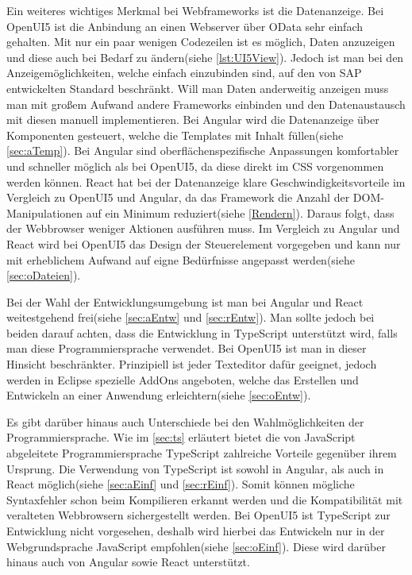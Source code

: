 Ein weiteres wichtiges Merkmal bei Webframeworks ist die Datenanzeige. Bei OpenUI5 ist die Anbindung an einen Webserver über OData sehr einfach gehalten. Mit nur ein paar wenigen Codezeilen ist es möglich, Daten anzuzeigen und diese auch bei Bedarf zu ändern(siehe \autoref{lst:UI5View}). Jedoch ist man bei den Anzeigemöglichkeiten, welche einfach einzubinden sind, auf den von SAP entwickelten Standard beschränkt. Will man Daten anderweitig anzeigen muss man mit großem Aufwand andere Frameworks einbinden und den Datenaustausch mit diesen manuell implementieren. Bei Angular wird die Datenanzeige über Komponenten gesteuert, welche die Templates mit Inhalt füllen(siehe \autoref{sec:aTemp}). Bei Angular sind oberflächenspezifische Anpassungen komfortabler und schneller möglich als bei OpenUI5, da diese direkt im CSS vorgenommen werden können. React hat bei der Datenanzeige klare Geschwindigkeitsvorteile im Vergleich zu OpenUI5 und Angular, da das Framework die Anzahl der DOM-Manipulationen auf ein Minimum reduziert(siehe \autoref{Rendern}). Daraus folgt, dass der Webbrowser weniger Aktionen ausführen muss. Im Vergleich zu Angular und React wird bei OpenUI5 das Design der Steuerelement vorgegeben und kann nur mit erheblichem Aufwand auf eigne Bedürfnisse angepasst werden(siehe \autoref{sec:oDateien}).  

Bei der Wahl der Entwicklungsumgebung ist man bei Angular und React weitestgehend frei(siehe \autoref{sec:aEntw} und \ref{sec:rEntw}). Man sollte jedoch bei beiden darauf achten, dass die Entwicklung in TypeScript unterstützt wird, falls man diese Programmiersprache verwendet. Bei OpenUI5 ist man in dieser Hinsicht beschränkter. Prinzipiell ist jeder Texteditor dafür geeignet, jedoch werden in Eclipse spezielle AddOns angeboten, welche das Erstellen und Entwickeln an einer Anwendung erleichtern(siehe \autoref{sec:oEntw}).

Es gibt darüber hinaus auch Unterschiede bei den Wahlmöglichkeiten der Programmiersprache. Wie im \autoref{sec:ts} erläutert bietet die von JavaScript abgeleitete Programmiersprache TypeScript zahlreiche Vorteile gegenüber ihrem Ursprung. Die Verwendung von TypeScript ist sowohl in Angular, als auch in React möglich(siehe \autoref{sec:aEinf} und \ref{sec:rEinf}). Somit können mögliche Syntaxfehler schon beim Kompilieren erkannt werden und die Kompatibilität mit veralteten Webbrowsern sichergestellt werden. Bei OpenUI5 ist TypeScript zur Entwicklung nicht vorgesehen, deshalb wird hierbei das Entwickeln nur in der Webgrundsprache JavaScript empfohlen(siehe \autoref{sec:oEinf}). Diese wird darüber hinaus auch von Angular sowie React unterstützt.

